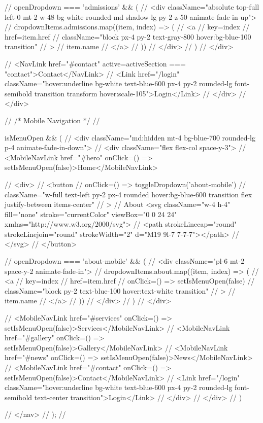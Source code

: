 {//             {openDropdown === 'admissions' && (
//               <div className="absolute top-full left-0 mt-2 w-48 bg-white rounded-md shadow-lg py-2 z-50 animate-fade-in-up">
//                 {dropdownItems.admissions.map((item, index) => (
//                   <a 
//                     key={index} 
//                     href={item.href} 
//                     className="block px-4 py-2 text-gray-800 hover:bg-blue-100 transition"
//                   >
//                     {item.name}
//                   </a>
//                 ))}
//               </div>
//             )}
//           </div>
          
//           <NavLink href="#contact" active={activeSection === "contact"}>Contact</NavLink>
//           <Link href="/login" className="hover:underline bg-white text-blue-600 px-4 py-2 rounded-lg font-semibold transition transform hover:scale-105">Login</Link>
//         </div>
//       </div>
      
//       {/* Mobile Navigation */}
//       {isMenuOpen && (
//         <div className="md:hidden mt-4 bg-blue-700 rounded-lg p-4 animate-fade-in-down">
//           <div className="flex flex-col space-y-3">
//             <MobileNavLink href="#hero" onClick={() => setIsMenuOpen(false)}>Home</MobileNavLink>
            
//             <div>
//               <button 
//                 onClick={() => toggleDropdown('about-mobile')}
//                 className="w-full text-left py-2 px-4 rounded hover:bg-blue-600 transition flex justify-between items-center"
//               >
//                 About <svg className="w-4 h-4" fill="none" stroke="currentColor" viewBox="0 0 24 24" xmlns="http://www.w3.org/2000/svg">
//                   <path strokeLinecap="round" strokeLinejoin="round" strokeWidth="2" d="M19 9l-7 7-7-7"></path>
//                 </svg>
//               </button>
              
//               {openDropdown === 'about-mobile' && (
//                 <div className="pl-6 mt-2 space-y-2 animate-fade-in">
//                   {dropdownItems.about.map((item, index) => (
//                     <a 
//                       key={index} 
//                       href={item.href} 
//                       onClick={() => setIsMenuOpen(false)}
//                       className="block py-2 text-blue-100 hover:text-white transition"
//                     >
//                       {item.name}
//                     </a>
//                   ))}
//                 </div>
//               )}
//             </div>
            
//             <MobileNavLink href="#services" onClick={() => setIsMenuOpen(false)}>Services</MobileNavLink>
//             <MobileNavLink href="#gallery" onClick={() => setIsMenuOpen(false)}>Gallery</MobileNavLink>
//             <MobileNavLink href="#news" onClick={() => setIsMenuOpen(false)}>News</MobileNavLink>
//             <MobileNavLink href="#contact" onClick={() => setIsMenuOpen(false)}>Contact</MobileNavLink>
//             <Link href="/login" className="hover:underline bg-white text-blue-600 px-4 py-2 rounded-lg font-semibold text-center transition">Login</Link>
//           </div>
//         </div>
//       )}
//     </nav>
//   );
// }

